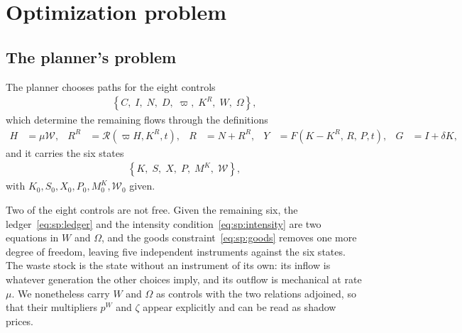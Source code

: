 ﻿\section{Optimization problem}\label{sec:sp:opt}

\subsection{The planner's problem}\label{sec:sp:opt:problem}

 The planner chooses paths for the eight controls
\begin{align}
    \left\{C,\;I,\;N,\;D,\;\varpi,\;K^R,\;W,\;\Omega\right\},
\label{eq:sp:controls}
\end{align}
which determine the remaining flows through the definitions
\begin{align}
H &= \mu\mathcal W,
&
R^R &= \mathcal R\left(\varpi H,K^R, t\right),
&
R &= N+R^R,
&
Y &= F\left(K-K^R,\,R,\,P, t\right),
&
G &= I+\delta K,
\label{eq:sp:definitions}
\end{align}
and it carries the six states
\begin{align}
\left\{K,\;S,\;X,\;P,\;M^K,\;\mathcal W\right\},
\label{eq:sp:states}
\end{align}
with $K_0,S_0,X_0,P_0,M^K_0,\mathcal W_0$ given.

Two of the eight controls are not free. Given the remaining six, the ledger~\eqref{eq:sp:ledger} and the intensity condition~\eqref{eq:sp:intensity} are two equations in $W$ and $\Omega$, and the goods constraint~\eqref{eq:sp:goods} removes one more degree of freedom, leaving five independent instruments against the six states. The waste stock is the state without an instrument of its own: its inflow is whatever generation the other choices imply, and its outflow is mechanical at rate $\mu$. We nonetheless carry $W$ and $\Omega$ as controls with the two relations adjoined, so that their multipliers $p^W$ and $\zeta$ appear explicitly and can be read as shadow prices.


